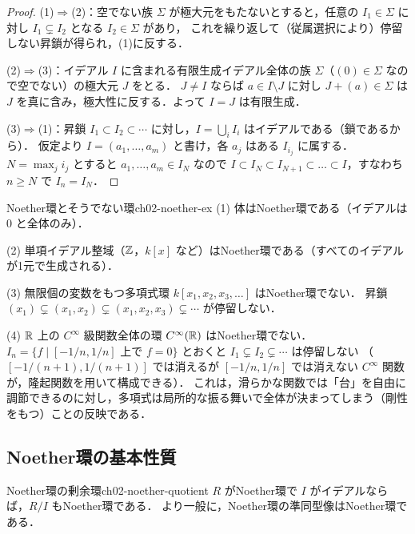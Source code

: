 \begin{proof}
(1)$\Rightarrow$(2)：空でない族 $\Sigma$ が極大元をもたないとすると，任意の $I_1\in\Sigma$ に対し $I_1\subsetneq I_2$ となる $I_2\in\Sigma$ があり，
これを繰り返して（従属選択により）停留しない昇鎖が得られ，(1)に反する．

(2)$\Rightarrow$(3)：イデアル $I$ に含まれる有限生成イデアル全体の族 $\Sigma$（$(0)\in\Sigma$ なので空でない）の極大元 $J$ をとる．
$J\ne I$ ならば $a\in I\setminus J$ に対し $J+(a)\in\Sigma$ は $J$ を真に含み，極大性に反する．よって $I=J$ は有限生成．

(3)$\Rightarrow$(1)：昇鎖 $I_1\subset I_2\subset\cdots$ に対し，$I=\bigcup_iI_i$ はイデアルである（鎖であるから）．
仮定より $I=(a_1,\dots,a_m)$ と書け，各 $a_j$ はある $I_{i_j}$ に属する．$N=\max_ji_j$ とすると $a_1,\dots,a_m\in I_N$ なので
$I\subset I_N\subset I_{N+1}\subset\dots\subset I$，すなわち $n\ge N$ で $I_n=I_N$．
\end{proof}

\begin{myex}{Noether環とそうでない環}{ch02-noether-ex}
(1) 体はNoether環である（イデアルは $0$ と全体のみ）．

(2) 単項イデアル整域（$\mathbb{Z}$，$k[x]$ など）はNoether環である（すべてのイデアルが1元で生成される）．

(3) 無限個の変数をもつ多項式環 $k[x_1,x_2,x_3,\dots]$ はNoether環でない．
昇鎖 $(x_1)\subsetneq(x_1,x_2)\subsetneq(x_1,x_2,x_3)\subsetneq\cdots$ が停留しない．

(4) $\mathbb{R}$ 上の $C^\infty$ 級関数全体の環 $C^\infty(\mathbb{R})$ はNoether環でない．
$I_n=\{f\mid [-1/n,1/n]\text{ 上で }f=0\}$ とおくと $I_1\subsetneq I_2\subsetneq\cdots$ は停留しない
（$[-1/(n+1),1/(n+1)]$ では消えるが $[-1/n,1/n]$ では消えない $C^\infty$ 関数が，隆起関数を用いて構成できる）．
これは，滑らかな関数では「台」を自由に調節できるのに対し，多項式は局所的な振る舞いで全体が決まってしまう（剛性をもつ）ことの反映である．
\end{myex}

\subsection{Noether環の基本性質}

\begin{myprop}{Noether環の剰余環}{ch02-noether-quotient}
$R$ がNoether環で $I$ がイデアルならば，$R/I$ もNoether環である．
より一般に，Noether環の準同型像はNoether環である．
\end{myprop}


